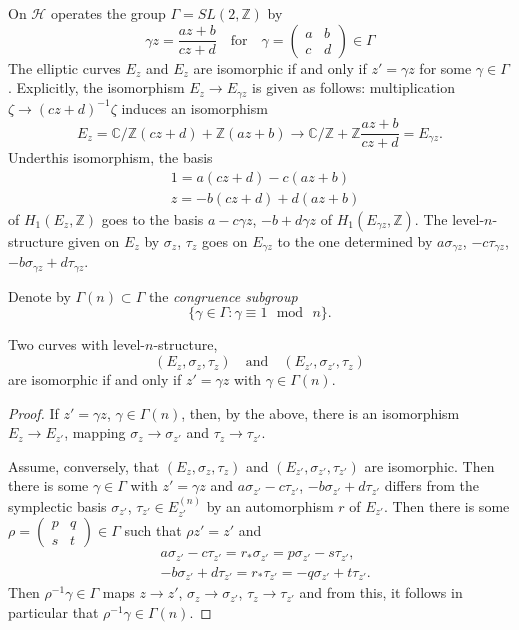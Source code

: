 On $\mathscr{H}$ operates the group $\Gamma=SL(2,\mathbb{Z})$ by
$$
\gamma z=\dfrac{az+b}{cz+d}\quad\text{for}\quad \gamma=
\begin{pmatrix}
a & b\\
c & d
\end{pmatrix}
\in \Gamma
$$
The elliptic curves $E_{z}$ and $E_{z}$ are isomorphic if and only if
$z'=\gamma z$ for some $\gamma\in \Gamma$. Explicitly, the isomorphism
$E_{z}\to E_{\gamma z}$ is given as follows: multiplication $\zeta\to
(cz+d)^{-1}\zeta$ induces an isomorphism
$$
E_{z}=\mathbb{C}/\mathbb{Z}(cz+d)+\mathbb{Z}(az+b)\to \mathbb{C}/\mathbb{Z}+\mathbb{Z}\dfrac{az+b}{cz+d}=E_{\gamma
z}. 
$$
Under\pageoriginale this isomorphism, the basis
\begin{align*}
& 1=a(cz+d)-c(az+b)\\
& z=-b(cz+d)+d(az+b)
\end{align*}
of $H_{1}(E_{z},\mathbb{Z})$ goes to the basis $a-c\gamma z$,
$-b+d\gamma z$ of $H_{1}(E_{\gamma z},\mathbb{Z})$. The
level-$n$-structure given on $E_{z}$ by $\sigma_{z}$, $\tau_{z}$ goes
on $E_{\gamma z}$ to the one determined by $a\sigma_{\gamma z}$,
$-c\tau_{\gamma z}$, $-b\sigma_{\gamma z}+d\tau_{\gamma z}$.

Denote by $\Gamma(n)\subset \Gamma$ the {\em congruence subgroup}
$$
\{\gamma\in \Gamma:\gamma\equiv 1\text{~ mod~ } n\}.
$$

\begin{lemma}\label{chap2-lem6}
Two curves with level-$n$-structure, 
$$
(E_{z},\sigma_{z},\tau_{z})\quad\text{and}\quad
(E_{z'},\sigma_{z'},\tau_{z})
$$ 
are isomorphic if and only if
$z'=\gamma z$ with $\gamma\in \Gamma(n)$. 
\end{lemma}

\begin{proof}
If $z'=\gamma z$, $\gamma\in \Gamma(n)$, then, by the above, there is
an isomorphism $E_{z}\to E_{z'}$, mapping $\sigma_{z}\to \sigma_{z'}$
and $\tau_{z}\to \tau_{z'}$.

Assume, conversely, that $(E_{z},\sigma_{z},\tau_{z})$ and
$(E_{z'},\sigma_{z'},\tau_{z'})$ are isomorphic. Then there is some
$\gamma\in \Gamma$ with $z'=\gamma z$ and $a\sigma_{z'}-c\tau_{z'}$,
$-b\sigma_{z'}+d\tau_{z'}$ differs from the symplectic basis
$\sigma_{z'}$, $\tau_{z'}\in E^{(n)}_{z'}$ by an automorphism $r$ of
$E_{z'}$. Then there is some $\rho=\left(\begin{smallmatrix} p & q\\ s
& t\end{smallmatrix}\right)\in \Gamma$ such that $\rho z'=z'$ and 
\begin{align*}
& a\sigma_{z'}-c\tau_{z'}=r_{*}\sigma_{z'}=p\sigma_{z'}-s\tau_{z'},\\
& -b\sigma_{z'}+d\tau_{z'}=r_{*}\tau_{z'}=-q\sigma_{z'}+t\tau_{z'}.
\end{align*}\pageoriginale
Then $\rho^{-1}\gamma\in \Gamma$ maps $z\to z'$,
$\sigma_{z}\to \sigma_{z'}$, $\tau_{z}\to \tau_{z'}$ and from this, it
follows in particular that $\rho^{-1}\gamma\in \Gamma(n)$. 
\end{proof}

